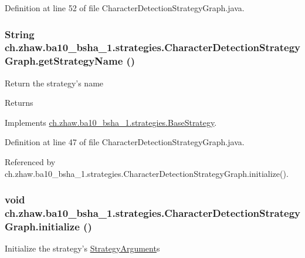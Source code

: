 Definition at line 52 of file CharacterDetectionStrategyGraph.java.\hypertarget{classch_1_1zhaw_1_1ba10__bsha__1_1_1strategies_1_1CharacterDetectionStrategyGraph_a3d897fb9be39b36575cf7d4630580445}{
\subsubsection[{getStrategyName}]{\setlength{\rightskip}{0pt plus 5cm}String ch.zhaw.ba10\_\-bsha\_\-1.strategies.CharacterDetectionStrategyGraph.getStrategyName ()}}
\label{classch_1_1zhaw_1_1ba10__bsha__1_1_1strategies_1_1CharacterDetectionStrategyGraph_a3d897fb9be39b36575cf7d4630580445}
Return the strategy's name

\begin{DoxyReturn}{Returns}

\end{DoxyReturn}


Implements \hyperlink{classch_1_1zhaw_1_1ba10__bsha__1_1_1strategies_1_1BaseStrategy_aa0ebed55eed45409bad13d43a0058780}{ch.zhaw.ba10\_\-bsha\_\-1.strategies.BaseStrategy}.

Definition at line 47 of file CharacterDetectionStrategyGraph.java.

Referenced by ch.zhaw.ba10\_\-bsha\_\-1.strategies.CharacterDetectionStrategyGraph.initialize().\hypertarget{classch_1_1zhaw_1_1ba10__bsha__1_1_1strategies_1_1CharacterDetectionStrategyGraph_af9451b15c51430529b038840360a21c6}{
\subsubsection[{initialize}]{\setlength{\rightskip}{0pt plus 5cm}void ch.zhaw.ba10\_\-bsha\_\-1.strategies.CharacterDetectionStrategyGraph.initialize ()}}
\label{classch_1_1zhaw_1_1ba10__bsha__1_1_1strategies_1_1CharacterDetectionStrategyGraph_af9451b15c51430529b038840360a21c6}
Initialize the strategy's \hyperlink{classch_1_1zhaw_1_1ba10__bsha__1_1_1StrategyArgument}{StrategyArgument}s 

